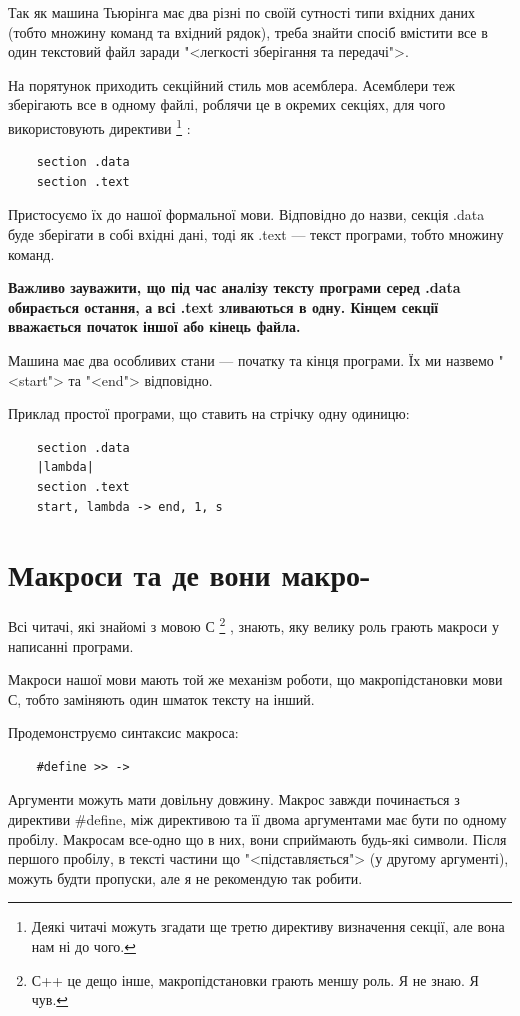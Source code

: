 \documentclass[oneside,final,14pt]{extreport}
\begin{document}
Так як машина Тьюрінга має два різні по своїй сутності типи вхідних даних (тобто множину команд та вхідний рядок), треба знайти спосіб вмістити все в один текстовий файл заради  "<легкості зберігання та передачі">.

На порятунок приходить секційний стиль мов асемблера.
Асемблери теж зберігають все в одному файлі, роблячи це в окремих секціях, для чого використовують директиви
\footnote{Деякі читачі можуть згадати ще третю директиву визначення секції, але вона нам ні до чого.}
:
\begin{verbatim}
	section .data
	section .text
\end{verbatim}
Пристосуємо їх до нашої формальної мови. Відповідно до назви, секція .data буде зберігати в собі вхідні дані, тоді як .text --- текст програми, тобто множину команд.

{\bfseries Важливо зауважити, що під час аналізу тексту програми серед .data обирається остання, а всі .text зливаються в одну. Кінцем секції вважається початок іншої або кінець файла.}

Машина має два особливих стани --- початку та кінця програми. Їх ми назвемо "<start"> та "<end"> відповідно.

Приклад простої програми, що ставить на стрічку одну одиницю:
\begin{verbatim}
	section .data
	|lambda|
	section .text
	start, lambda -> end, 1, s
\end{verbatim}

\section{Макроси та де вони макро-}
Всі читачі, які знайомі з мовою С
\footnote{С++ це дещо інше, макропідстановки грають меншу роль. Я не знаю. Я чув.}
, знають, яку велику роль грають макроси у написанні програми.

Макроси нашої мови мають той же механізм роботи, що макропідстановки мови С, тобто заміняють один шматок тексту на інший.
		
Продемонструємо синтаксис макроса:
		
\begin{verbatim}
	#define >> ->
\end{verbatim}
		
Аргументи можуть мати довільну довжину. Макрос завжди починається з директиви {\ttfamily \#define}, між директивою та її двома аргументами має бути по одному пробілу. Макросам все-одно що в них, вони сприймають будь-які символи. Після першого пробілу, в тексті частини що "<підставляється"> (у другому аргументі), можуть будти пропуски, але я не рекомендую так робити.
\end{document}
